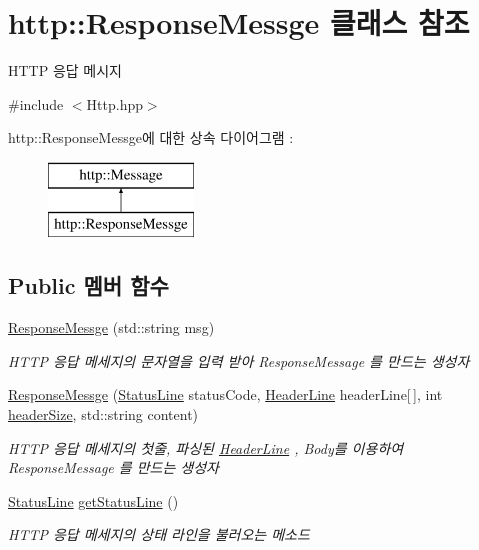 \hypertarget{classhttp_1_1_response_messge}{}\section{http\+:\+:Response\+Messge 클래스 참조}
\label{classhttp_1_1_response_messge}


H\+T\+TP 응답 메시지  




{\ttfamily \#include $<$Http.\+hpp$>$}

http\+:\+:Response\+Messge에 대한 상속 다이어그램 \+: \begin{figure}[H]
\begin{center}
\leavevmode
\includegraphics[height=2.000000cm]{classhttp_1_1_response_messge}
\end{center}
\end{figure}
\subsection*{Public 멤버 함수}
\begin{DoxyCompactItemize}
\item 
\hyperlink{classhttp_1_1_response_messge_a20f120ead2d600fc033c3f5ce3d5174e}{Response\+Messge} (std\+::string msg)
\begin{DoxyCompactList}\small\item\em H\+T\+TP 응답 메세지의 문자열을 입력 받아 Response\+Message 를 만드는 생성자 \end{DoxyCompactList}\item 
\hyperlink{classhttp_1_1_response_messge_a278fe12044ee4b4d69b75b3bf6dbe652}{Response\+Messge} (\hyperlink{structhttp_1_1_status_line}{Status\+Line} status\+Code, \hyperlink{structhttp_1_1_header_line}{Header\+Line} header\+Line\mbox{[}$\,$\mbox{]}, int \hyperlink{classhttp_1_1_message_abf4fab93257b3d37930ed20627f1c061}{header\+Size}, std\+::string content)
\begin{DoxyCompactList}\small\item\em H\+T\+TP 응답 메세지의 첫줄, 파싱된 \hyperlink{structhttp_1_1_header_line}{Header\+Line} , Body를 이용하여 Response\+Message 를 만드는 생성자 \end{DoxyCompactList}\item 
\hyperlink{structhttp_1_1_status_line}{Status\+Line} \hyperlink{classhttp_1_1_response_messge_a1be9d3205a0b413828f336c094be4c86}{get\+Status\+Line} ()
\begin{DoxyCompactList}\small\item\em H\+T\+TP 응답 메세지의 상태 라인을 불러오는 메소드 \end{DoxyCompactList}\end{DoxyCompactItemize}
